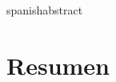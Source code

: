 \setlength{}


\newenvironment{catalanabstract} {
  \cleardoublepage
  \setsinglecolumn
  \chapter*{\centering \Large Resum}
  \thispagestyle{empty}
}

\newenvironment{spanishabstract} {
  \cleardoublepage
  \setsinglecolumn
  \chapter*{\centering \Large Resumen}
  \thispagestyle{empty}
}







\setlength{\emergencystretch}{3em}








\ifuseCustomBib

